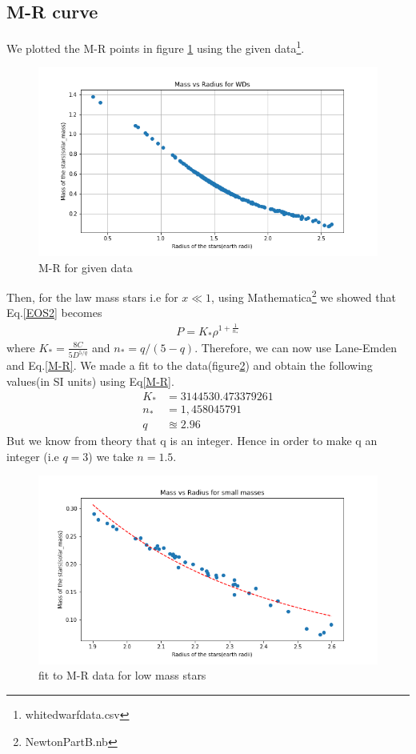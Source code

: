 \documentclass[aps,twocolumn,showpacs,preprintnumbers,nofootinbib,prl,superscriptaddress,groupedaddress]{revtex4-1}
\begin{document}
\subsection{M-R curve}
We plotted the M-R points in figure \ref{fig:m-r-data} using the given data\footnote{whitedwarfdata.csv}. 
\begin{figure}
	\centering
	\includegraphics[width=1.0\linewidth]{"Figures/M-R data"}
	\caption{M-R for given data}
	\label{fig:m-r-data}
\end{figure}
Then, for the law mass stars i.e for $x\ll1$, using Mathematica\footnote{NewtonPartB.nb} we showed that Eq.\ref{EOS2} becomes
\begin{align}\label{EOS3}
	P = K_*\rho^{ 1 + \frac{1}{n_*}}
\end{align}
where $K_* = \frac{8C}{5D^{5/q}}$ and $n_* = q/(5-q)$. Therefore, we can now use Lane-Emden and Eq.\ref{M-R}. We made a fit to the data(figure\ref{fig:fit-to-m-r-low-mass}) and obtain the following values(in SI units) using Eq\ref{M-R}.
\begin{align}
	K_* &= 3144530.473379261\nonumber\\
	n_* &= 1,458045791\nonumber\\
	q &\approxeq 2.96 \nonumber
\end{align}
But we know from theory that q is an integer. Hence in order to make q an integer (i.e $q = 3$) we take $n = 1.5$.
\begin{figure}\label{fit}
	\centering
	\includegraphics[width=1.0\linewidth]{"Figures/fit to M-R (low mass)"}
	\caption{fit to M-R data for low mass stars}
	\label{fig:fit-to-m-r-low-mass}
\end{figure}
\end{document}
